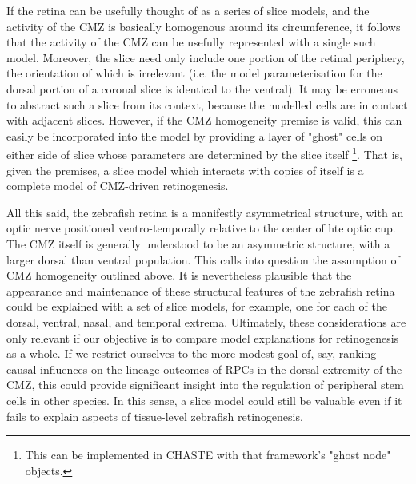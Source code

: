If the retina can be usefully thought of as a series of slice models, and the activity of the CMZ is basically homogenous around its circumference, it follows that the activity of the CMZ can be usefully represented with a single such model. Moreover, the slice need only include one portion of the retinal periphery, the orientation of which is irrelevant (i.e. the model parameterisation for the dorsal portion of a coronal slice is identical to the ventral). It may be erroneous to abstract such a slice from its context, because the modelled cells are in contact with adjacent slices. However, if the CMZ homogeneity premise is valid, this can easily be incorporated into the model by providing a layer of "ghost" cells on either side of slice whose parameters are determined by the slice itself \footnote{This can be implemented in CHASTE with that framework's "ghost node" objects.}. That is, given the premises, a slice model which interacts with copies of itself is a complete model of CMZ-driven retinogenesis.

All this said, the zebrafish retina is a manifestly asymmetrical structure, with an optic nerve positioned ventro-temporally relative to the center of hte optic cup. The CMZ itself is generally understood to be an asymmetric structure, with a larger dorsal than ventral population. This calls into question the assumption of CMZ homogeneity outlined above. It is nevertheless plausible that the appearance and maintenance of these structural features of the zebrafish retina could be explained with a set of slice models, for example, one for each of the dorsal, ventral, nasal, and temporal extrema. Ultimately, these considerations are only relevant if our objective is to compare model explanations for retinogenesis as a whole. If we restrict ourselves to the more modest goal of, say, ranking causal influences on the lineage outcomes of RPCs in the dorsal extremity of the CMZ, this could provide significant insight into the regulation of peripheral stem cells in other species. In this sense, a slice model could still be valuable even if it fails to explain aspects of tissue-level zebrafish retinogenesis.

